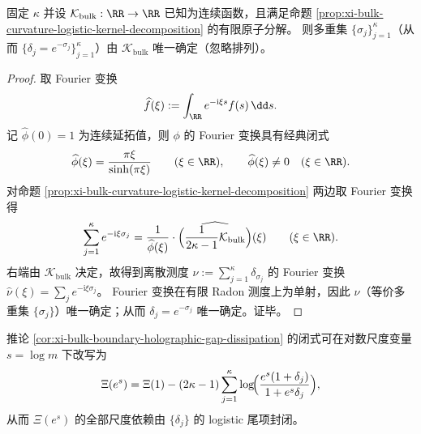 \begin{proposition}\label{prop:xi-bulk-curvature-tomography-identifiability}
固定 \(\kappa\) 并设 \(\mathcal{K}_{\mathrm{bulk}}:\RR\to\RR\) 已知为连续函数，且满足命题 \ref{prop:xi-bulk-curvature-logistic-kernel-decomposition} 的有限原子分解。
则多重集 \(\{\sigma_j\}_{j=1}^{\kappa}\)（从而 \(\{\delta_j=e^{-\sigma_j}\}_{j=1}^{\kappa}\)）由 \(\mathcal{K}_{\mathrm{bulk}}\) 唯一确定（忽略排列）。
\end{proposition}
\begin{proof}
取 Fourier 变换
\[
\widehat f(\xi):=\int_{\RR}e^{-\mathrm{i}\xi s}f(s)\,\dd s.
\]
记 \(\widehat\phi(0)=1\) 为连续延拓值，则 \(\phi\) 的 Fourier 变换具有经典闭式
\[
\widehat\phi(\xi)=\frac{\pi\xi}{\sinh(\pi\xi)}\qquad(\xi\in\RR),
\qquad
\widehat\phi(\xi)\neq 0\quad(\xi\in\RR).
\]
对命题 \ref{prop:xi-bulk-curvature-logistic-kernel-decomposition} 两边取 Fourier 变换得
\[
\sum_{j=1}^{\kappa}e^{-\mathrm{i}\xi\sigma_j}
=\frac{1}{\widehat\phi(\xi)}\cdot
\widehat{\Bigl(\frac{1}{2\kappa-1}\mathcal{K}_{\mathrm{bulk}}\Bigr)}(\xi)
\qquad(\xi\in\RR).
\]
右端由 \(\mathcal{K}_{\mathrm{bulk}}\) 决定，故得到离散测度 \(\nu:=\sum_{j=1}^{\kappa}\delta_{\sigma_j}\) 的 Fourier 变换 \(\widehat\nu(\xi)=\sum_j e^{-\mathrm{i}\xi\sigma_j}\)。
Fourier 变换在有限 Radon 测度上为单射，因此 \(\nu\)（等价多重集 \(\{\sigma_j\}\)）唯一确定；从而 \(\delta_j=e^{-\sigma_j}\) 唯一确定。证毕。
\end{proof}

\begin{remark}\label{rem:xi-holographic-gap-closed-trajectory}
推论 \ref{cor:xi-bulk-boundary-holographic-gap-dissipation} 的闭式可在对数尺度变量 \(s=\log m\) 下改写为
\[
\Xi(e^s)
=\Xi(1)-(2\kappa-1)\sum_{j=1}^{\kappa}\log\!\Bigl(\frac{e^{s}(1+\delta_j)}{1+e^{s}\delta_j}\Bigr),
\]
从而 \(\Xi(e^s)\) 的全部尺度依赖由 \(\{\delta_j\}\) 的 logistic 尾项封闭。
\end{remark}

